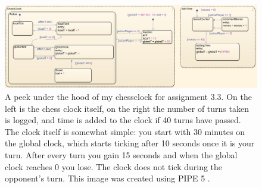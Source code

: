 \documentclass{article}
\newcommand{\subfigimg}[3][,]{%
	\setbox1=\hbox{\texttt{[image: \#3]}}%
	\leavevmode\rlap{\usebox1}%
	\rlap{\hspace*{0.9\linewidth}\raisebox{\dimexpr\ht1-1.75\baselineskip}{#2}}%
	\phantom{\usebox1}%
}
\begin{document}
	\begin{figure}
		\centering
		\includegraphics[width=1.0\textwidth]{Ass3_3_chart}
		\caption{A peek under the hood of my chessclock for assignment 3.3. On the left is the chess clock itself, on the right the number of turns taken is logged, and time is added to the clock if 40 turns have passed. The clock itself is somewhat simple: you start with 30 minutes on the global clock, which starts ticking after 10 seconds once it is your turn. After every turn you gain 15 seconds and when the global clock reaches 0 you lose. The clock does not tick during the opponent's turn.
		 This image was created using PIPE 5 \cite{dingle2009pipe2, bonet2007pipe}. \label{fig:ass3_3_chart}}
	\end{figure}
	
	
	\newpage 
	
	

		
	
\end{document}
